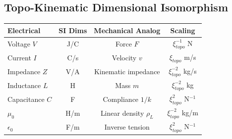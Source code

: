 \subsection*{Topo-Kinematic Dimensional Isomorphism}
\begin{center}
\small
\renewcommand{\arraystretch}{1.2}
\begin{tabular}{lccc}
\toprule
\textbf{Electrical} & \textbf{SI Dims} & \textbf{Mechanical Analog} & \textbf{Scaling} \\
\midrule
Voltage $V$      & J/C    & Force $F$          & $\xi_{topo}^{-1}$ N \\
Current $I$      & C/s    & Velocity $v$       & $\xi_{topo}$ m/s \\
Impedance $Z$    & V/A    & Kinematic impedance & $\xi_{topo}^{-2}$ kg/s \\
Inductance $L$   & H      & Mass $m$           & $\xi_{topo}^{-2}$ kg \\
Capacitance $C$  & F      & Compliance $1/k$   & $\xi_{topo}^{2}$ N$^{-1}$ \\
$\mu_0$          & H/m    & Linear density $\rho_L$ & $\xi_{topo}^{-2}$ kg/m \\
$\epsilon_0$     & F/m    & Inverse tension     & $\xi_{topo}^{2}$ N$^{-1}$ \\
\bottomrule
\end{tabular}
\end{center}